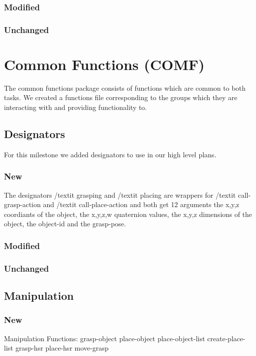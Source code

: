 \documentclass[main.tex]{subfiles}
\begin{document}
                \subsubsection{Modified}
                \subsubsection{Unchanged}

                
                \section{Common Functions (COMF)}
                The common functions package consists of functions which are common to both tasks. We created a functions file corresponding to the groups which they are interacting with and providing functionality to.
                \subsection{Designators}
                For this milestone we added designators to use in our high level plans.
                \subsubsection{New} 
                The designators /textit {grasping} and /textit {placing} are wrappers for /textit {call-grasp-action} and /textit {call-place-action} and both get 12 arguments the x,y,z coordiants of the object, the x,y,z,w quaternion values, the x,y,z dimensions of the object, the object-id and the grasp-pose. 

                \subsubsection{Modified}
                \subsubsection{Unchanged}
                
                \subsection{Manipulation}
                \subsubsection{New}
                Manipulation Functions:
                grasp-object
                place-object
                place-object-list
                create-place-list
                grasp-hsr
                place-hsr
                move-grasp
\end{document}
